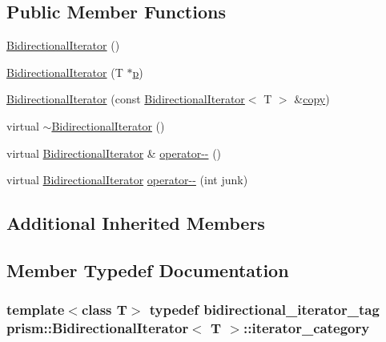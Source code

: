 \subsection*{Public Member Functions}
\begin{DoxyCompactItemize}
\item 
\hyperlink{classprism_1_1_bidirectional_iterator_a1d494640e51b72fee5dd601a722924a1}{Bidirectional\+Iterator} ()
\item 
\hyperlink{classprism_1_1_bidirectional_iterator_aad22e3ea552e27f9ccb82bcb4999575b}{Bidirectional\+Iterator} (T $\ast$\hyperlink{classprism_1_1_forward_iterator_a44e23472687df2dcf68780ba6173557a}{p})
\item 
\hyperlink{classprism_1_1_bidirectional_iterator_aaa3bb795687f32d6db825f08659669be}{Bidirectional\+Iterator} (const \hyperlink{classprism_1_1_bidirectional_iterator}{Bidirectional\+Iterator}$<$ T $>$ \&\hyperlink{namespaceprism_ae776f4cd825f79e7af1cf6ee1d90a209}{copy})
\item 
virtual \hyperlink{classprism_1_1_bidirectional_iterator_a949f84e373e2631cc694ebc5d81423f9}{$\sim$\+Bidirectional\+Iterator} ()
\item 
virtual \hyperlink{classprism_1_1_bidirectional_iterator}{Bidirectional\+Iterator} \& \hyperlink{classprism_1_1_bidirectional_iterator_a71598fbf44926424c189553b0f756b57}{operator-\/-\/} ()
\item 
virtual \hyperlink{classprism_1_1_bidirectional_iterator}{Bidirectional\+Iterator} \hyperlink{classprism_1_1_bidirectional_iterator_a4484088181be6f02cbc60c165db3189c}{operator-\/-\/} (int junk)
\end{DoxyCompactItemize}
\subsection*{Additional Inherited Members}


\subsection{Member Typedef Documentation}
\subsubsection[{\texorpdfstring{iterator\+\_\+category}{iterator_category}}]{\setlength{\rightskip}{0pt plus 5cm}template$<$class T$>$ typedef {\bf bidirectional\+\_\+iterator\+\_\+tag} {\bf prism\+::\+Bidirectional\+Iterator}$<$ T $>$\+::{\bf iterator\+\_\+category}}\hypertarget{classprism_1_1_bidirectional_iterator_a88ba2497fb00dd276b2cfb799cb61bc2}{}\label{classprism_1_1_bidirectional_iterator_a88ba2497fb00dd276b2cfb799cb61bc2}


